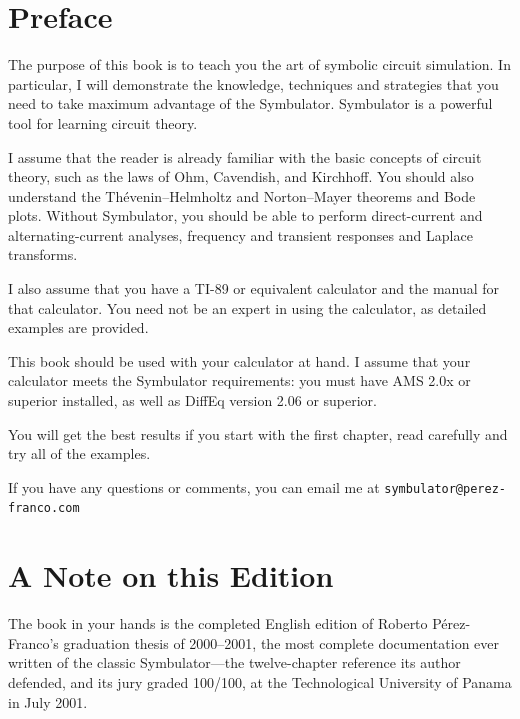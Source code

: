 \documentclass[11pt,oneside]{report}
\newcommand{\code}[1]{\texttt{#1}}
\begin{document}

\chapter*{Preface}

The purpose of this book is to teach you the art of symbolic circuit
simulation. In particular, I will demonstrate the knowledge,
techniques and strategies that you need to take maximum advantage of
the Symbulator. Symbulator is a powerful tool for learning circuit
theory.

I assume that the reader is already familiar with the basic concepts
of circuit theory, such as the laws of Ohm, Cavendish, and
Kirchhoff. You should also understand the Th\'evenin--Helmholtz and
Norton--Mayer theorems and Bode plots. Without Symbulator, you
should be able to perform direct-current and alternating-current
analyses, frequency and transient responses and Laplace transforms.

I also assume that you have a TI-89 or equivalent calculator and the
manual for that calculator. You need not be an expert in using the
calculator, as detailed examples are provided.

This book should be used with your calculator at hand. I assume that
your calculator meets the Symbulator requirements: you must have AMS
2.0x or superior installed, as well as DiffEq version 2.06 or
superior.

You will get the best results if you start with the first chapter,
read carefully and try all of the examples.

If you have any questions or comments, you can email me at
\code{symbulator@perez-franco.com}


\chapter*{A Note on this Edition}

The book in your hands is the completed English edition of Roberto
P\'erez-Franco's graduation thesis of 2000--2001, the most complete
documentation ever written of the classic Symbulator---the
twelve-chapter reference its author defended, and its jury graded
100/100, at the Technological University of Panama in July 2001.
\end{document}
